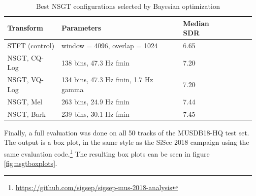 \documentclass[letter,12pt,notitlepage]{article}
\begin{document}
\begin{table}[ht]
	\centering
\begin{tabular}{ |l|l|l|c|c|c| }
	 \hline
	  Transform & Parameters & Median SDR \\
	 \hline
	 \hline
	 STFT (control) & window = 4096, overlap = 1024 & 6.65 \\
	 \hline
	 NSGT, CQ-Log & 138 bins, 47.3 Hz fmin & 7.20 \\
	 \hline
	 NSGT, VQ-Log & 134 bins, 47.3 Hz fmin, 1.7 Hz gamma & 7.20 \\
	 \hline
	 NSGT, Mel & 263 bins, 24.9 Hz fmin & 7.44 \\
	 \hline
	 NSGT, Bark & 239 bins, 30.1 Hz fmin & 7.45 \\
	 \hline
\end{tabular}
	\caption{Best NSGT configurations selected by Bayesian optimization}
	\label{table:nsgtbayesresults}
\end{table}

Finally, a full evaluation was done on all 50 tracks of the MUSDB18-HQ test set. The output is a box plot, in the same style as the SiSec 2018 campaign using the same evaluation code.\footnote{\href{https://github.com/sigsep/sigsep-mus-2018-analysis}{https://github.com/sigsep/sigsep-mus-2018-analysis}} The resulting box plots can be seen in figure \ref{fig:nsgtboxplots}.
\end{document}
